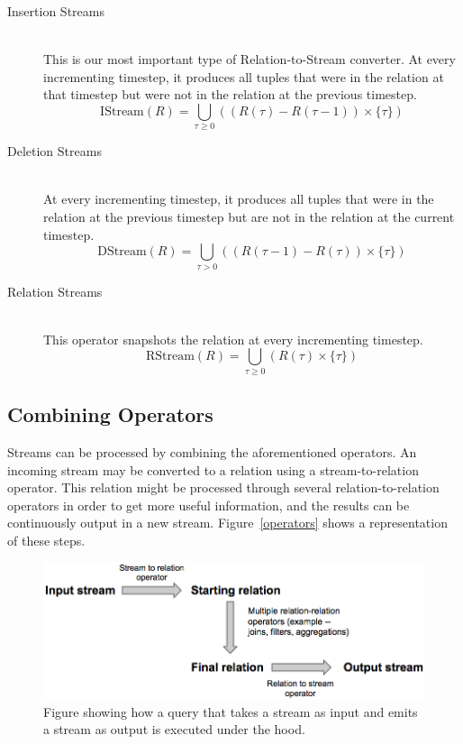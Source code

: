 \documentclass[a4paper, 10pt, conference]{IEEEconf}
\begin{document}
\begin{description}
    \item[Insertion Streams] \hfill \\
    This is our most important type of Relation-to-Stream converter. At every incrementing timestep, it produces all tuples that were in the relation at that timestep but were not in the relation at the previous timestep.
    $$\text{IStream}(R) = \bigcup_{\tau \geq 0} ((R(\tau) - R(\tau - 1)) \times \{\tau\})$$

    \item[Deletion Streams] \hfill \\
    At every incrementing timestep, it produces all tuples that were in the relation at the previous timestep but are not in the relation at the current timestep.
    $$\text{DStream}(R) = \bigcup_{\tau > 0} ((R(\tau - 1) - R(\tau)) \times \{\tau\})$$

    \item[Relation Streams] \hfill \\
    This operator snapshots the relation at every incrementing timestep.
    $$\text{RStream}(R) = \bigcup_{\tau \geq 0} (R(\tau) \times \{\tau\})$$

\end{description}

\subsection{Combining Operators}
Streams can be processed by combining the aforementioned operators.  An incoming stream may be converted to a relation using a stream-to-relation operator.  This relation might be processed through several relation-to-relation operators in order to get more useful information, and the results can be continuously output in a new stream.  Figure~\ref{operators} shows a representation of these steps.

\begin{figure}[h!]
    \centering
    \centerline{\includegraphics[totalheight=2.5cm]{operators.png}}
    \caption{Figure showing how a query that takes a stream as input and emits a stream as output is executed under the hood.}
    \label{fig:operators}
\end{figure}
\end{document}
